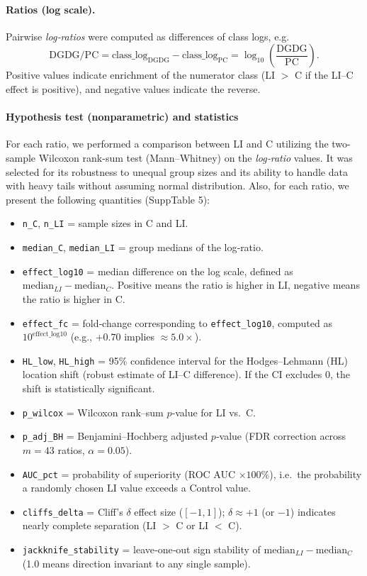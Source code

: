 \documentclass[10pt,letterpaper]{article}
\begin{document}
\paragraph{Ratios (log scale).}
Pairwise \emph{log‐ratios} were computed as differences of class logs, e.g.
\[
\text{DGDG/PC} = \text{class\_log}_{\text{DGDG}} - \text{class\_log}_{\text{PC}} 
= \log_{10}\!\left(\frac{\text{DGDG}}{\text{PC}}\right).
\]
Positive values indicate enrichment of the numerator class (LI $>$ C if the LI–C effect is positive), and negative values indicate the reverse.

\paragraph{Hypothesis test (nonparametric) and statistics}
For each ratio, we performed a comparison between LI and C utilizing the two-sample Wilcoxon rank-sum test (Mann–Whitney) on the \emph{log‐ratio} values. It was selected for its robustness to unequal group sizes and its ability to handle data with heavy tails without assuming normal distribution. Also, for each ratio, we present the following quantities (SuppTable 5):

\begin{itemize}
\item \texttt{n\_C}, \texttt{n\_LI} = sample sizes in C and LI.
\item \texttt{median\_C}, \texttt{median\_LI} =  group medians of the log‐ratio.
\item \texttt{effect\_log10} = median difference on the log scale, defined as $\text{median}_{LI} - \text{median}_{C}$. Positive means the ratio is higher in LI, negative means the ratio is higher in C. 
\item \texttt{effect\_fc} = fold‐change corresponding to \texttt{effect\_log10}, computed as $10^{\text{effect\_log10}}$ (e.g., $+0.70$ implies $\approx 5.0\times$).
\item \texttt{HL\_low}, \texttt{HL\_high} = 95\% confidence interval for the Hodges–Lehmann (HL) location shift (robust estimate of LI–C difference). If the CI excludes 0, the shift is statistically significant.
\item \texttt{p\_wilcox} = Wilcoxon rank–sum $p$‐value for LI vs.\ C.
\item \texttt{p\_adj\_BH} = Benjamini–Hochberg adjusted $p$‐value (FDR correction across $m=43$ ratios, $\alpha=0.05$).
\item \texttt{AUC\_pct} = probability of superiority (ROC AUC $\times 100\%$), i.e.\ the probability a randomly chosen LI value exceeds a Control value.
\item \texttt{cliffs\_delta} = Cliff’s $\delta$ effect size ($[-1,1]$); $\delta \approx +1$ (or $-1$) indicates nearly complete separation (LI $>$ C or LI $<$ C). 
\item \texttt{jackknife\_stability} = leave‐one‐out sign stability of $\text{median}_{LI} - \text{median}_{C}$ (1.0 means direction invariant to any single sample).
\end{itemize}
\end{document}
